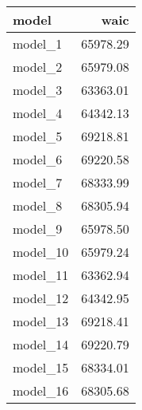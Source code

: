 
\begin{tabular}{lr}
\toprule
model & waic\\
\midrule
model\_1 & 65978.29\\
model\_2 & 65979.08\\
model\_3 & 63363.01\\
model\_4 & 64342.13\\
model\_5 & 69218.81\\
\addlinespace
model\_6 & 69220.58\\
model\_7 & 68333.99\\
model\_8 & 68305.94\\
model\_9 & 65978.50\\
model\_10 & 65979.24\\
\addlinespace
model\_11 & 63362.94\\
model\_12 & 64342.95\\
model\_13 & 69218.41\\
model\_14 & 69220.79\\
model\_15 & 68334.01\\
\addlinespace
model\_16 & 68305.68\\
\bottomrule
\end{tabular}
